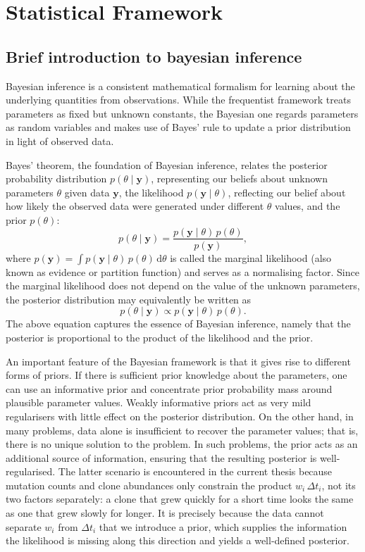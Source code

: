\section{Statistical Framework}

\subsection{Brief introduction to bayesian inference}
Bayesian inference is a consistent mathematical formalism for learning about the 
underlying quantities from observations. While the frequentist framework treats 
parameters as fixed but unknown constants, the Bayesian one regards parameters as 
random variables and makes use of Bayes' rule to update a prior distribution in 
light of observed data.

Bayes' theorem, the foundation of Bayesian inference, relates the posterior 
probability distribution $p(\theta \mid \mathbf{y})$, representing our beliefs 
about unknown parameters $\theta$ given data $\mathbf{y}$, the likelihood 
$p(\mathbf{y} \mid \theta)$, reflecting our belief about how likely the observed 
data were generated under different $\theta$ values, and the prior $p(\theta)$:
%
\begin{equation}
    p(\theta \mid \mathbf{y}) = \frac{p(\mathbf{y} \mid \theta)\, p(\theta)}{p(\mathbf{y})},
\end{equation}
%
where $p(\mathbf{y}) = \int p(\mathbf{y} \mid \theta)\, p(\theta)\, \mathrm{d}\theta$ 
is called the marginal likelihood (also known as evidence or partition function) and 
serves as a normalising factor. Since the marginal likelihood does not depend on the 
value of the unknown parameters, the posterior distribution may equivalently be 
written as
%
\begin{equation}
    p(\theta \mid \mathbf{y}) \propto p(\mathbf{y} \mid \theta)\, p(\theta).
\end{equation}
%
The above equation captures the essence of Bayesian inference, namely that the 
posterior is proportional to the product of the likelihood and the prior.

An important feature of the Bayesian framework is that it gives rise to different 
forms of priors. If there is sufficient prior knowledge about the parameters, one 
can use an informative prior and concentrate prior probability mass around plausible 
parameter values. Weakly informative priors act as very mild regularisers with 
little effect on the posterior distribution. On the other hand, in many problems, 
data alone is insufficient to recover the parameter values; that is, there is no 
unique solution to the problem. In such problems, the prior acts as an additional 
source of information, ensuring that the resulting posterior is well-regularised. 
The latter scenario is encountered in the current thesis because mutation counts
and clone abundances only constrain the product $w_i \, \Delta t_i$, not its two
factors separately: a clone that grew quickly for a short time looks the same as
one that grew slowly for longer. It is precisely because the data cannot separate
$w_i$ from $\Delta t_i$ that we introduce a prior, which supplies the information
the likelihood is missing along this direction and yields a well-defined posterior.

